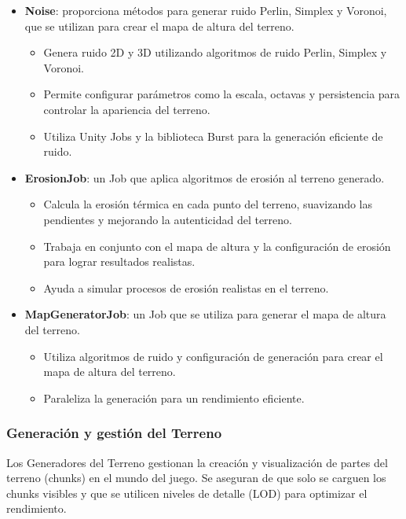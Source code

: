 \begin{itemize}
    
    \item \textbf{Noise}: proporciona métodos para generar ruido Perlin, Simplex y Voronoi, que se utilizan para crear el mapa de altura del terreno.
    \begin{itemize}
        \item Genera ruido 2D y 3D utilizando algoritmos de ruido Perlin, Simplex y Voronoi.
        \item Permite configurar parámetros como la escala, octavas y persistencia para controlar la apariencia del terreno.
        \item Utiliza Unity Jobs y la biblioteca Burst para la generación eficiente de ruido.
    \end{itemize}

    \item \textbf{ErosionJob}: un Job que aplica algoritmos de erosión al terreno generado.
    \begin{itemize}
        \item Calcula la erosión térmica en cada punto del terreno, suavizando las pendientes y mejorando la autenticidad del terreno.
        \item Trabaja en conjunto con el mapa de altura y la configuración de erosión para lograr resultados realistas.
        \item Ayuda a simular procesos de erosión realistas en el terreno.
    \end{itemize}

    \item \textbf{MapGeneratorJob}: un Job que se utiliza para generar el mapa de altura del terreno.
    \begin{itemize}
        \item Utiliza algoritmos de ruido y configuración de generación para crear el mapa de altura del terreno.
        \item Paraleliza la generación para un rendimiento eficiente.
    \end{itemize}
    
\end{itemize}

\subsubsection{Generación y gestión del Terreno}

Los Generadores del Terreno gestionan la creación y visualización de partes del terreno (chunks) en el mundo del juego. Se aseguran de que solo se carguen los chunks visibles y que se utilicen niveles de detalle (LOD) para optimizar el rendimiento.

